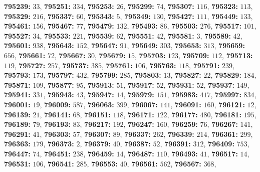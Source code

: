 \textsf{\bfseries 795239:} $33$, \textsf{\bfseries 795251:} $334$, \textsf{\bfseries 795253:} $26$, \textsf{\bfseries 795299:} $74$, \textsf{\bfseries 795307:} $116$, \textsf{\bfseries 795323:} $113$, \textsf{\bfseries 795329:} $216$, \textsf{\bfseries 795337:} $60$, \textsf{\bfseries 795343:} $5$, \textsf{\bfseries 795349:} $130$, \textsf{\bfseries 795427:} $111$, \textsf{\bfseries 795449:} $133$, \textsf{\bfseries 795461:} $156$, \textsf{\bfseries 795467:} $77$, \textsf{\bfseries 795479:} $132$, \textsf{\bfseries 795493:} $86$, \textsf{\bfseries 795503:} $276$, \textsf{\bfseries 795517:} $101$, \textsf{\bfseries 795527:} $34$, \textsf{\bfseries 795533:} $221$, \textsf{\bfseries 795539:} $62$, \textsf{\bfseries 795551:} $42$, \textsf{\bfseries 795581:} $3$, \textsf{\bfseries 795589:} $42$, \textsf{\bfseries 795601:} $938$, \textsf{\bfseries 795643:} $152$, \textsf{\bfseries 795647:} $91$, \textsf{\bfseries 795649:} $303$, \textsf{\bfseries 795653:} $313$, \textsf{\bfseries 795659:} $656$, \textsf{\bfseries 795661:} $72$, \textsf{\bfseries 795667:} $30$, \textsf{\bfseries 795679:} $15$, \textsf{\bfseries 795703:} $123$, \textsf{\bfseries 795709:} $112$, \textsf{\bfseries 795713:} $119$, \textsf{\bfseries 795727:} $257$, \textsf{\bfseries 795737:} $385$, \textsf{\bfseries 795761:} $106$, \textsf{\bfseries 795763:} $118$, \textsf{\bfseries 795791:} $239$, \textsf{\bfseries 795793:} $173$, \textsf{\bfseries 795797:} $432$, \textsf{\bfseries 795799:} $285$, \textsf{\bfseries 795803:} $13$, \textsf{\bfseries 795827:} $22$, \textsf{\bfseries 795829:} $184$, \textsf{\bfseries 795871:} $109$, \textsf{\bfseries 795877:} $95$, \textsf{\bfseries 795913:} $51$, \textsf{\bfseries 795917:} $52$, \textsf{\bfseries 795931:} $52$, \textsf{\bfseries 795937:} $149$, \textsf{\bfseries 795941:} $331$, \textsf{\bfseries 795943:} $43$, \textsf{\bfseries 795947:} $14$, \textsf{\bfseries 795979:} $151$, \textsf{\bfseries 795983:} $417$, \textsf{\bfseries 795997:} $834$, \textsf{\bfseries 796001:} $19$, \textsf{\bfseries 796009:} $587$, \textsf{\bfseries 796063:} $399$, \textsf{\bfseries 796067:} $141$, \textsf{\bfseries 796091:} $160$, \textsf{\bfseries 796121:} $12$, \textsf{\bfseries 796139:} $21$, \textsf{\bfseries 796141:} $68$, \textsf{\bfseries 796151:} $118$, \textsf{\bfseries 796171:} $122$, \textsf{\bfseries 796177:} $480$, \textsf{\bfseries 796181:} $195$, \textsf{\bfseries 796189:} $79$, \textsf{\bfseries 796193:} $83$, \textsf{\bfseries 796217:} $192$, \textsf{\bfseries 796247:} $160$, \textsf{\bfseries 796259:} $76$, \textsf{\bfseries 796267:} $141$, \textsf{\bfseries 796291:} $41$, \textsf{\bfseries 796303:} $57$, \textsf{\bfseries 796307:} $89$, \textsf{\bfseries 796337:} $262$, \textsf{\bfseries 796339:} $214$, \textsf{\bfseries 796361:} $299$, \textsf{\bfseries 796363:} $179$, \textsf{\bfseries 796373:} $2$, \textsf{\bfseries 796379:} $40$, \textsf{\bfseries 796387:} $52$, \textsf{\bfseries 796391:} $312$, \textsf{\bfseries 796409:} $753$, \textsf{\bfseries 796447:} $74$, \textsf{\bfseries 796451:} $238$, \textsf{\bfseries 796459:} $14$, \textsf{\bfseries 796487:} $110$, \textsf{\bfseries 796493:} $41$, \textsf{\bfseries 796517:} $14$, \textsf{\bfseries 796531:} $106$, \textsf{\bfseries 796541:} $285$, \textsf{\bfseries 796553:} $40$, \textsf{\bfseries 796561:} $562$, \textsf{\bfseries 796567:} $368$, 
